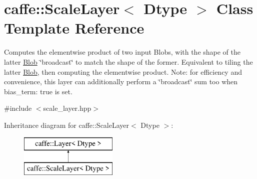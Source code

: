 \hypertarget{classcaffe_1_1ScaleLayer}{}\section{caffe\+:\+:Scale\+Layer$<$ Dtype $>$ Class Template Reference}
\label{classcaffe_1_1ScaleLayer}


Computes the elementwise product of two input Blobs, with the shape of the latter \hyperlink{classcaffe_1_1Blob}{Blob} \char`\"{}broadcast\char`\"{} to match the shape of the former. Equivalent to tiling the latter \hyperlink{classcaffe_1_1Blob}{Blob}, then computing the elementwise product. Note\+: for efficiency and convenience, this layer can additionally perform a \char`\"{}broadcast\char`\"{} sum too when {\ttfamily bias\+\_\+term\+: true} is set.  




{\ttfamily \#include $<$scale\+\_\+layer.\+hpp$>$}

Inheritance diagram for caffe\+:\+:Scale\+Layer$<$ Dtype $>$\+:\begin{figure}[H]
\begin{center}
\leavevmode
\includegraphics[height=2.000000cm]{classcaffe_1_1ScaleLayer}
\end{center}
\end{figure}

